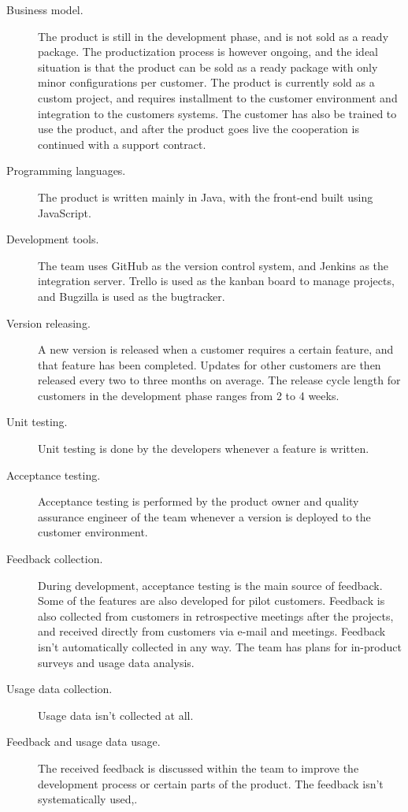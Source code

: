 \documentclass[english, grading]{tktltiki2}
\theoremstyle{definition}
\theoremstyle{remark}
\begin{document}
\begin{description}
  \item[Business model.] The product is still in the development phase, and is not sold as a ready package. The productization process is however ongoing, and the ideal situation is that the product can be sold as a ready package with only minor configurations per customer. The product is currently sold as a custom project, and requires installment to the customer environment and integration to the customers systems. The customer has also be trained to use the product, and after the product goes live the cooperation is continued with a support contract.
  \item[Programming languages.] The product is written mainly in Java, with the front-end built using JavaScript. 
  \item[Development tools.] The team uses GitHub as the version control system, and Jenkins as the integration server. Trello is used as the kanban board to manage projects, and Bugzilla is used as the bugtracker. 
  \item[Version releasing.] A new version is released when a customer requires a certain feature, and that feature has been completed. Updates for other customers are then released every two to three months on average. The release cycle length for customers in the development phase ranges from 2 to 4 weeks. 
  \item[Unit testing.] Unit testing is done by the developers whenever a feature is written. 
  \item[Acceptance testing.] Acceptance testing is performed by the product owner and quality assurance engineer of the team whenever a version is deployed to the customer environment. 
  \item[Feedback collection.] During development, acceptance testing is the main source of feedback. Some of the features are also developed for pilot customers. Feedback is also collected from customers in retrospective meetings after the projects, and received directly from customers via e-mail and meetings. Feedback isn't automatically collected in any way. The team has plans for in-product surveys and usage data analysis.
  \item[Usage data collection.] Usage data isn't collected at all.
  \item[Feedback and usage data usage.] The received feedback is discussed within the team to improve the development process or certain parts of the product. The feedback isn't systematically used,. 
\end{description}
\end{document}

